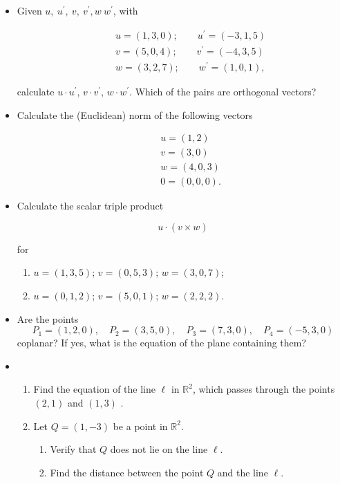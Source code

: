 \documentclass[12pt,a4paper]{article}
\begin{document}
\begin{itemize}
	\item Given
	$u,\:u^{\prime},\:v,\:v^{\prime},w\:w^{\prime}$, with
	
	\begin{eqnarray*}
		& & u=(1,3,0);\qquad u^{\prime}=(-3,1,5)\\
		& & v=(5,0,4);\qquad v^{\prime}=(-4,3,5)\\
		& & w=(3,2,7);\qquad w^{\prime}=(1,0,1),
	\end{eqnarray*}
	
	calculate $u\cdot u^{\prime}$, $v\cdot v^{\prime}$, $w\cdot
	w^{\prime}$. Which of the pairs are orthogonal vectors?
	
	\vspace{0.25cm}\item Calculate the (Euclidean) norm of the
	following vectors
	
	\begin{eqnarray*}
		& & u=(1,2)\\
		& & v=(3,0)\\
		& & w=(4,0,3)\\
		& & 0=(0,0,0).
	\end{eqnarray*}
	\item Calculate the scalar triple product
	
	\[u\cdot (v\times w)\]
	
	for
	
	\begin{enumerate}
		\item $u=(1,3,5)$; $v=(0,5,3)$; $w=(3,0,7)$;
		
		\item $u=(0,1,2)$; $v=(5,0,1)$; $w=(2,2,2).$
	\end{enumerate}
	\vfill\item Are the points 
	$$P_1=(1,2,0), \quad P_2=(3,5,0),\quad P_3=(7,3,0), \quad P_4=(-5,3,0)
	$$
	coplanar? If yes, what is the equation of the plane containing them?
	
	\vfill\item
	\begin{enumerate}
		\item Find the equation of the line $\ell$ in $\mathbb{R}^2$, which  passes through the 
		points $(2,1)$ and $(1,3)$ .
		
		\item  Let $Q = (1, -3)$  be a point in $\mathbb{R}^2$.
		\begin{enumerate}
			\item Verify that $Q$ does not lie on the line $\ell$.
			
			\item Find the distance between the point $Q$ and the line $\ell$.
		\end{enumerate}
	\end{enumerate}\newpage
	\vspace{0.25cm}
	
\end{itemize}
\end{document}
